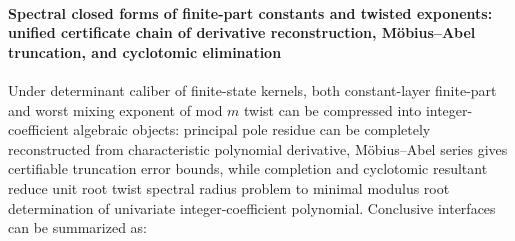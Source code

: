 \paragraph{Spectral closed forms of finite-part constants and twisted exponents: unified certificate chain of derivative reconstruction, M\"obius--Abel truncation, and cyclotomic elimination}
Under determinant caliber of finite-state kernels, both constant-layer finite-part and worst mixing exponent of mod \(m\) twist can be compressed into integer-coefficient algebraic objects: principal pole residue can be completely reconstructed from characteristic polynomial derivative, M\"obius--Abel series gives certifiable truncation error bounds, while completion and cyclotomic resultant reduce unit root twist spectral radius problem to minimal modulus root determination of univariate integer-coefficient polynomial. Conclusive interfaces can be summarized as:
